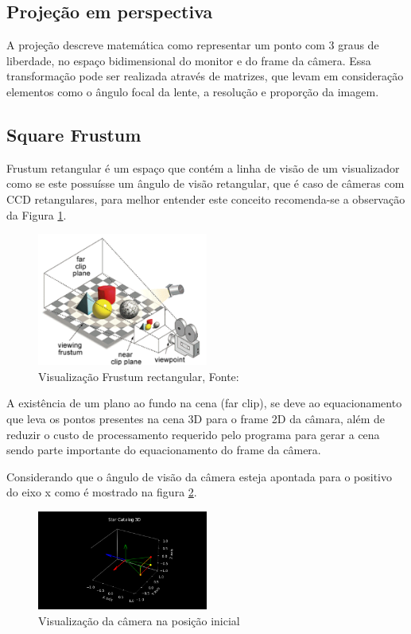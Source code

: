 \subsection{Projeção em perspectiva}

A projeção descreve matemática como representar um ponto com 3 graus de liberdade, no espaço bidimensional do monitor e do frame da câmera. Essa transformação pode ser realizada através de matrizes, que levam em consideração elementos como o ângulo focal da lente, a resolução e proporção da imagem.

\subsection{Square Frustum}

Frustum retangular é um espaço que contém a linha de visão de  um visualizador como se este possuísse um ângulo de visão retangular, que é caso de câmeras com CCD retangulares, para melhor entender este conceito recomenda-se a observação da Figura \ref{fig:frustum}.

\begin{figure}[H]
    \centering
    \includegraphics[width=0.5\textwidth]{images/frustum.png}
    \caption{Visualização Frustum rectangular, Fonte: ~\cite[]{the_free_dictionary}}
    \label{fig:frustum}
\end{figure}

A existência de um plano ao fundo na cena (far clip), se deve ao equacionamento que leva os pontos presentes na cena 3D para o frame 2D da câmara, além de reduzir o custo de processamento requerido pelo programa para gerar a cena sendo parte importante do equacionamento do frame da câmera.

Considerando que o ângulo de visão da câmera esteja apontada para o positivo do eixo x como é mostrado na figura \ref{fig:posicao_inicial_camera}.

\begin{figure}[H]
    \centering
    \includegraphics[width=0.5\textwidth]{images/posicao_inicial_camera.png}
    \caption{Visualização da câmera na posição inicial}
    \label{fig:posicao_inicial_camera}
\end{figure}

